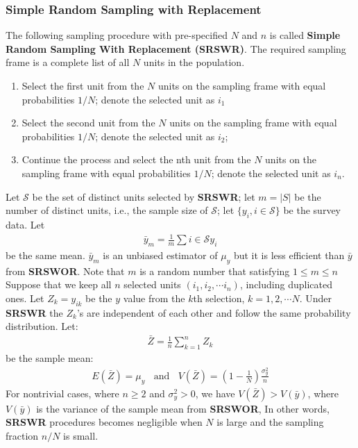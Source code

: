 \documentclass[a4paper,twoside,11pt]{article}
\begin{document}
{\subsubsection{Simple Random Sampling with Replacement}
The following sampling procedure with pre-specified $N$ and $n$ is called \textbf{Simple Random Sampling With Replacement (SRSWR)}. The required sampling frame is a complete list of all $N$ units in the population.
\begin{enumerate}
    \item Select the first unit from the $N$ units on the sampling frame with equal probabilities $1/N$; denote the selected unit as $i_1$
    \item Select the second unit from the $N$ units on the sampling frame with equal probabilities $1/N$; denote the selected unit as $i_2$;
    \item  Continue the process and select the nth unit from the $N$ units on the sampling frame with equal probabilities $1/N$; denote the selected unit as $i_n$.
\end{enumerate}
Let $\mathcal{S}$ be the set of distinct units selected by \textbf{SRSWR}; let $m =|S|$ be the number of distinct units, i.e., the sample size of $\mathcal{S}$; let $\{y_i, i \in \mathcal{S}\}$ be the survey data. Let
\begin{equation*}
\begin{aligned}
\bar{y}_m = \frac{1}{m} \sum{i \in \mathcal{S}} y_i
\end{aligned}
\end{equation*}
be the same mean. $\bar{y}_m$ is an unbiased estimator of $\mu_y$ but it is less efficient than $\bar{y}$ from \textbf{SRSWOR}. Note that $m$ is a random number that satisfying $1\le m \le n$
\newline
\newline
Suppose that we keep all $n$ selected units $(i_1,i_2,\cdots i_n)$, including duplicated ones. Let $Z_k = y_{ik}$ be the $y$ value from the $k$th selection, $k=1,2,\cdots N$. Under \textbf{SRSWR} the $Z_k$’s are independent of each other and follow the same probability distribution. Let:
\begin{equation*}
\begin{aligned}
\bar{Z} = \frac{1}{n} \sum^n_{k=1}Z_k
\end{aligned}
\end{equation*}
be the sample mean:
\begin{equation*}
\begin{aligned}
E(\bar{Z}) = \mu_y \ \ \ \ \text{and} \ \ \ \ V(\bar{Z}) = (1-\frac{1}{N})\frac{\sigma_y^2}{n}
\end{aligned}
\end{equation*}
For nontrivial cases, where $n \ge 2 $ and $\sigma_y^2 >0$, we have $V(\bar{Z}) > V(\bar{y})$, where $V(\bar{y})$ is the variance of the sample mean from \textbf{SRSWOR}, In other words, \textbf{SRSWR} procedures becomes negligible when $N$ is large and the sampling fraction $n/N$ is small.}
\end{document}
